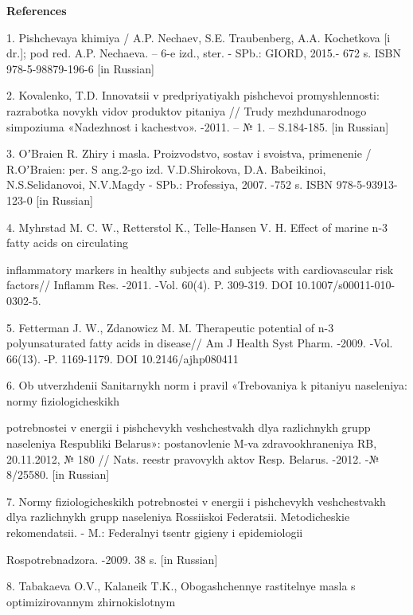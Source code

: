 \begin{center}
{\bfseries References}
\end{center}

\begin{noparindent}
1. Pishchevaya khimiya / A.P. Nechaev, S.E. Traubenberg, A.A. Kochetkova
{[}i dr.{]}; pod red. A.P. Nechaeva. -- 6-e izd., ster. - SPb.: GIORD,
2015.- 672 s. ISBN 978-5-98879-196-6 {[}in Russian{]}

2. Kovalenko, T.D. Innovatsii v predpriyatiyakh pishchevoi
promyshlennosti: razrabotka novykh vidov produktov pitaniya // Trudy
mezhdunarodnogo simpoziuma «Nadezhnost\textquotesingle{} i kachestvo».
-2011. -- № 1. -- S.184-185. {[}in Russian{]}

3. OʼBraien R. Zhiry i masla. Proizvodstvo, sostav i svoistva,
primenenie / R.OʼBraien: per. S ang.2-go izd. V.D.Shirokova, D.A.
Babeikinoi, N.S.Selidanovoi, N.V.Magdy - SPb.: Professiya, 2007. -752 s.
ISBN 978-5-93913-123-0 {[}in Russian{]}

4. Myhrstad M. C. W., Retterstol K., Telle-Hansen V. H. Effect of marine
n-3 fatty acids on circulating

inflammatory markers in healthy subjects
and subjects with cardiovascular risk factors// Inflamm Res. -2011.
-Vol. 60(4). P. 309-319. DOI 10.1007/s00011-010-0302-5.

5. Fetterman J. W., Zdanowicz M. M. Therapeutic potential of n-3
polyunsaturated fatty acids in disease// Am J Health Syst Pharm. -2009.
-Vol. 66(13). -P. 1169-1179. DOI 10.2146/ajhp080411

6. Ob utverzhdenii Sanitarnykh norm i pravil «Trebovaniya k pitaniyu
naseleniya: normy fiziologicheskikh

potrebnostei v energii i pishchevykh
veshchestvakh dlya razlichnykh grupp naseleniya Respubliki
Belarus\textquotesingle»: postanovlenie M-va zdravookhraneniya RB,
20.11.2012, № 180 // Nats. reestr pravovykh aktov Resp.
Belarus\textquotesingle. -2012. -№ 8/25580. {[}in Russian{]}

7. Normy fiziologicheskikh potrebnostei v energii i pishchevykh
veshchestvakh dlya razlichnykh grupp naseleniya Rossiiskoi Federatsii.
Metodicheskie rekomendatsii. - M.: Federal\textquotesingle nyi tsentr
gigieny i epidemiologii

Rospotrebnadzora. -2009. 38 s. {[}in Russian{]}

8. Tabakaeva O.V., Kalaneik T.K., Obogashchennye
rastitel\textquotesingle nye masla s optimizirovannym zhirnokislotnym



\end{noparindent}
